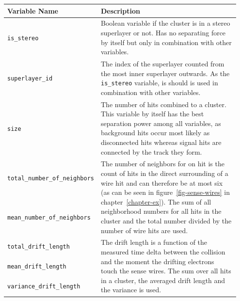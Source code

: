 \begin{table}
  \centering
  \begin{tabular}{p{0.35\linewidth}p{0.6\linewidth}} \toprule
   Variable Name & Description \\ \midrule
   \verb+is_stereo+ & Boolean variable if the cluster is in a stereo superlayer or not. Has no separating force by itself but only in combination with other variables. \\ \midrule 
   \verb+superlayer_id+ & The index of the superlayer counted from the most inner superlayer outwards. As the \verb+is_stereo+ variable, is should is used in combination with other variables.\\ \midrule 
   
   \verb+size+ & The number of hits combined to a cluster. This variable by itself has the best separation power among all variables, as background hits occur most likely as disconnected hits whereas signal hits are connected by the track they form.  \\ \midrule 
   
   \verb+total_number_of_neighbors+ & \multirow{2}{*}[-1.5pt]{\begin{minipage}{\linewidth} The number of neighbors for on hit is the count of hits in the direct surrounding of a wire hit and can therefore be at most six (as can be seen in figure~\ref{fig-sense-wires} in chapter~\ref{chapter-ex}). The sum of all neighborhood numbers for all hits in the cluster and the total number divided by the number of wire hits are used. \end{minipage}} \\[5ex] \cmidrule{1-1}
   \verb+mean_number_of_neighbors+ & \\[5ex] \midrule 
   
   \verb+total_drift_length+ & \multirow{3}{*}[-1.5pt]{\begin{minipage}{\linewidth} The drift length is a function of the measured time delta between the collision and the moment the drifting electrons touch the sense wires. The sum over all hits in a cluster, the averaged drift length and the variance is used. \end{minipage}} \\[1ex] \cmidrule{1-1}
   \verb+mean_drift_length+ & \\[1ex] \cmidrule{1-1}
   \verb+variance_drift_length+ & \\[1ex] \midrule 
   

\end{tabular}
\end{table}
